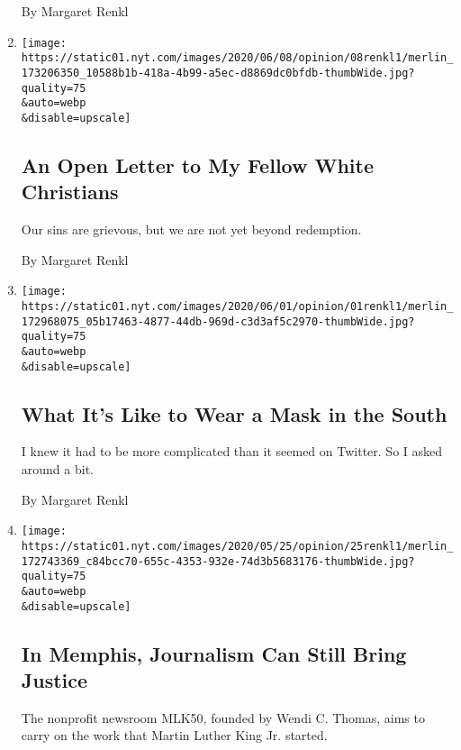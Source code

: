 \begin{enumerate}
  By Margaret Renkl
\item
  \href{/2020/06/08/opinion/protests-white-christian-racism.html}{}

  \texttt{[image: https://static01.nyt.com/images/2020/06/08/opinion/08renkl1/merlin\_173206350\_10588b1b-418a-4b99-a5ec-d8869dc0bfdb-thumbWide.jpg?quality=75\\\&auto=webp\\\&disable=upscale]}

  \hypertarget{an-open-letter-to-my-fellow-white-christians}{%
  \subsection{An Open Letter to My Fellow White
  Christians}\label{an-open-letter-to-my-fellow-white-christians}}

  Our sins are grievous, but we are not yet beyond redemption.

  By Margaret Renkl
\item
  \href{/2020/06/01/opinion/coronavirus-face-mask-south.html}{}

  \texttt{[image: https://static01.nyt.com/images/2020/06/01/opinion/01renkl1/merlin\_172968075\_05b17463-4877-44db-969d-c3d3af5c2970-thumbWide.jpg?quality=75\\\&auto=webp\\\&disable=upscale]}

  \hypertarget{what-its-like-to-wear-a-mask-in-the-south}{%
  \subsection{What It's Like to Wear a Mask in the
  South}\label{what-its-like-to-wear-a-mask-in-the-south}}

  I knew it had to be more complicated than it seemed on Twitter. So I
  asked around a bit.

  By Margaret Renkl
\item
  \href{/2020/05/25/opinion/memphis-journalism.html}{}

  \texttt{[image: https://static01.nyt.com/images/2020/05/25/opinion/25renkl1/merlin\_172743369\_c84bcc70-655c-4353-932e-74d3b5683176-thumbWide.jpg?quality=75\\\&auto=webp\\\&disable=upscale]}

  \hypertarget{in-memphis-journalism-can-still-bring-justice}{%
  \subsection{In Memphis, Journalism Can Still Bring
  Justice}\label{in-memphis-journalism-can-still-bring-justice}}

  The nonprofit newsroom MLK50, founded by Wendi C. Thomas, aims to
  carry on the work that Martin Luther King Jr. started.


\end{enumerate}
